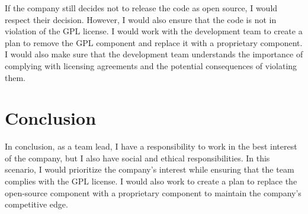 \documentclass{article}
\begin{document}
If the company still decides not to release the code as open source, I would respect their decision. However, I would also ensure that the code is not in violation of the GPL license. I would work with the development team to create a plan to remove the GPL component and replace it with a proprietary component. I would also make sure that the development team understands the importance of complying with licensing agreements and the potential consequences of violating them.

\section{Conclusion}
In conclusion, as a team lead, I have a responsibility to work in the best interest of the company, but I also have social and ethical responsibilities. In this scenario, I would prioritize the company's interest while ensuring that the team complies with the GPL license. I would also work to create a plan to replace the open-source component with a proprietary component to maintain the company's competitive edge.
\end{document}
